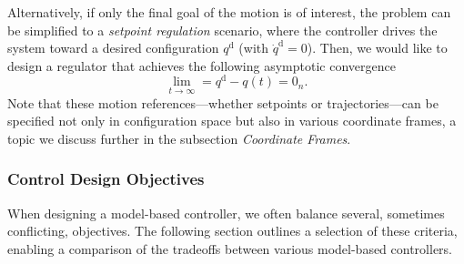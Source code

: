 Alternatively, if only the final goal of the motion is of interest, the problem can be simplified to a \emph{setpoint regulation} scenario, where the controller drives the system toward a desired configuration $q^\mathrm{d}$ (with $\dot{q}^\mathrm{d} = 0$). 
Then, we would like to design a regulator that achieves the following asymptotic convergence
\begin{equation}
    \lim_{t \to \infty} = q^\mathrm{d} - q(t) = 0_n.
\end{equation}
Note that these motion references—whether setpoints or trajectories—can be specified not only in configuration space but also in various coordinate frames, a topic we discuss further in the subsection \emph{Coordinate Frames}.


\subsubsection{Control Design Objectives}
When designing a model-based controller, we often balance several, sometimes conflicting, objectives. The following section outlines a selection of these criteria, enabling a comparison of the tradeoffs between various model-based controllers.

